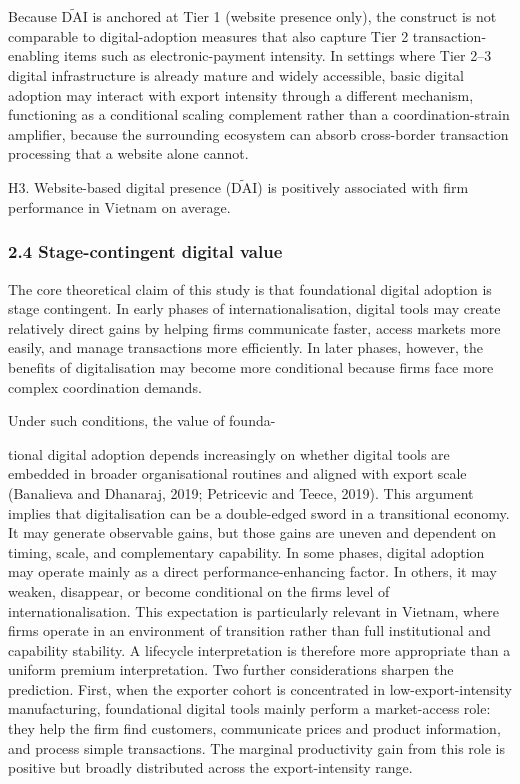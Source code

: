 \documentclass[12pt,a4paper]{article}
\begin{document}
Because \(\tilde{\mathrm{DAI}}\) is anchored at Tier 1 (website presence
only), the construct is not comparable to digital-adoption measures that
also capture Tier 2 transaction-enabling items such as
electronic-payment intensity. In settings where Tier 2--3 digital
infrastructure is already mature and widely accessible, basic digital
adoption may interact with export intensity through a different
mechanism, functioning as a conditional scaling complement rather than a
coordination-strain amplifier, because the surrounding ecosystem can
absorb cross-border transaction processing that a website alone cannot.

H3. Website-based digital presence (\(\tilde{\mathrm{DAI}}\)) is
positively associated with firm performance in Vietnam on average.

\hypertarget{24-stage-contingent-digital-value}{%
\subsubsection{2.4 Stage-contingent digital
value}\label{24-stage-contingent-digital-value}}

The core theoretical claim of this study is that foundational digital
adoption is stage contingent. In early phases of internationalisation,
digital tools may create relatively direct gains by helping firms
communicate faster, access markets more easily, and manage transactions
more efficiently. In later phases, however, the benefits of
digitalisation may become more conditional because firms face more
complex coordination demands.

Under such conditions, the value of founda-

tional digital adoption depends increasingly on whether digital tools
are embedded in broader organisational routines and aligned with export
scale (Banalieva and Dhanaraj, 2019; Petricevic and Teece, 2019). This
argument implies that digitalisation can be a double-edged sword in a
transitional economy. It may generate observable gains, but those gains
are uneven and dependent on timing, scale, and complementary capability.
In some phases, digital adoption may operate mainly as a direct
performance-enhancing factor. In others, it may weaken, disappear, or
become conditional on the firm\textquotesingle s level of
internationalisation. This expectation is particularly relevant in
Vietnam, where firms operate in an environment of transition rather than
full institutional and capability stability. A lifecycle interpretation
is therefore more appropriate than a uniform premium interpretation. Two
further considerations sharpen the prediction. First, when the exporter
cohort is concentrated in low-export-intensity manufacturing,
foundational digital tools mainly perform a market-access role: they
help the firm find customers, communicate prices and product
information, and process simple transactions. The marginal productivity
gain from this role is positive but broadly distributed across the
export-intensity range.
\end{document}
